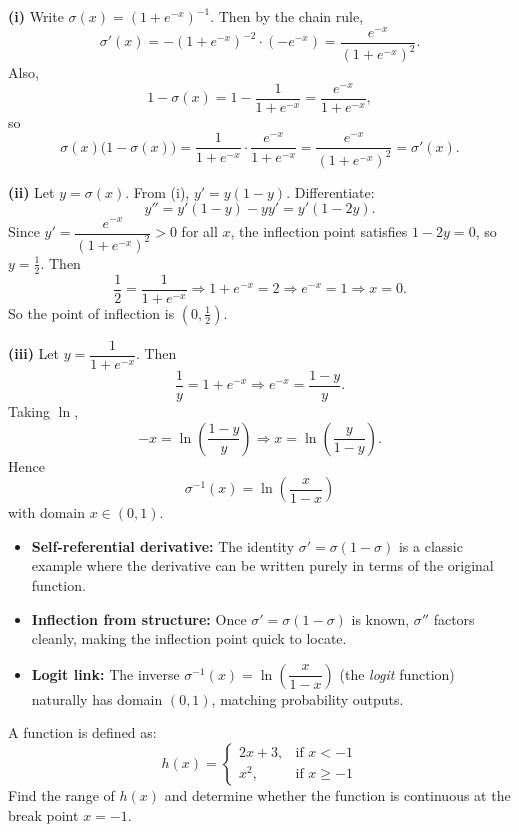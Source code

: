 \begin{solution}
\textbf{(i)} Write $\sigma(x)=(1+e^{-x})^{-1}$. Then by the chain rule,
\[
\sigma'(x)=-(1+e^{-x})^{-2}\cdot(-e^{-x})=\frac{e^{-x}}{(1+e^{-x})^2}.
\]
Also,
\[
1-\sigma(x)=1-\frac{1}{1+e^{-x}}=\frac{e^{-x}}{1+e^{-x}},
\]
so
\[
\sigma(x)\bigl(1-\sigma(x)\bigr)=\frac{1}{1+e^{-x}}\cdot\frac{e^{-x}}{1+e^{-x}}
=\frac{e^{-x}}{(1+e^{-x})^2}=\sigma'(x).
\]

\textbf{(ii)} Let $y=\sigma(x)$. From (i), $y'=y(1-y)$. Differentiate:
\[
y''=y'(1-y)-yy'=y'(1-2y).
\]
Since $y'=\dfrac{e^{-x}}{(1+e^{-x})^2}>0$ for all $x$, the inflection point satisfies $1-2y=0$, so $y=\tfrac12$.
Then
\[
\frac12=\frac{1}{1+e^{-x}}
\Longrightarrow
1+e^{-x}=2
\Longrightarrow
e^{-x}=1
\Longrightarrow
x=0.
\]
So the point of inflection is $\boxed{\left(0,\frac12\right)}$.

\textbf{(iii)} Let $y=\dfrac{1}{1+e^{-x}}$. Then
\[
\frac{1}{y}=1+e^{-x}
\Longrightarrow
e^{-x}=\frac{1-y}{y}.
\]
Taking $\ln$,
\[
-x=\ln\!\left(\frac{1-y}{y}\right)
\Longrightarrow
x=\ln\!\left(\frac{y}{1-y}\right).
\]
Hence
\[
\boxed{\sigma^{-1}(x)=\ln\!\left(\frac{x}{1-x}\right)}
\]
with domain $\boxed{x\in(0,1)}$.
\end{solution}

\begin{takeaways}
\begin{itemize}[leftmargin=*]
\item \textbf{Self-referential derivative:} The identity $\sigma'=\sigma(1-\sigma)$ is a classic example where the derivative can be written purely in terms of the original function.
\item \textbf{Inflection from structure:} Once $\sigma'=\sigma(1-\sigma)$ is known, $\sigma''$ factors cleanly, making the inflection point quick to locate.
\item \textbf{Logit link:} The inverse $\sigma^{-1}(x)=\ln\!\left(\dfrac{x}{1-x}\right)$ (the \emph{logit} function) naturally has domain $(0,1)$, matching probability outputs.
\end{itemize}
\end{takeaways}

\begin{problem}
A function is defined as:
\[
h(x) = \begin{cases} 
2x+3, & \text{if } x < -1 \\
x^2, & \text{if } x \ge -1 
\end{cases}
\]
Find the range of $h(x)$ and determine whether the function is continuous at the break point $x = -1$.
\end{problem}

